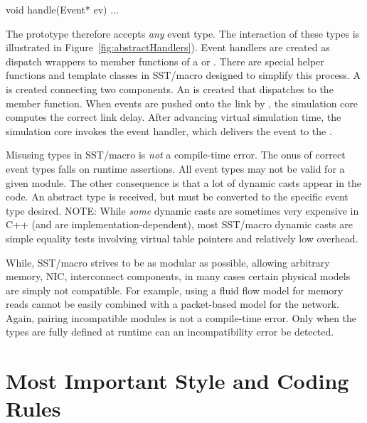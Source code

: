 \begin{CppCode}
void handle(Event* ev){
...
}
\end{CppCode}
The prototype therefore accepts \emph{any} event type. 
The interaction of these types is illustrated in Figure~\ref{fig:abstractHandlers}).
Event handlers are created as dispatch wrappers to member functions of a  or .
There are special helper functions and template classes in SST/macro designed to simplify this process.
A  is created connecting two components.
An  is created that dispatches to the  member function.
When events are pushed onto the link by ,
the simulation core computes the correct link delay.
After advancing virtual simulation time,
the simulation core invokes the event handler, which delivers the event to the .

Misusing types in SST/macro is \emph{not} a compile-time error.
The onus of correct event types falls on runtime assertions.
All event types may not be valid for a given module.
The other consequence is that a lot of dynamic casts appear in the code.
An abstract  type is received, but must be converted to the specific event type desired.
NOTE: While \emph{some} dynamic casts are sometimes very expensive in C++ (and are implementation-dependent),
most SST/macro dynamic casts are simple equality tests involving virtual table pointers and relatively low overhead.

While, SST/macro strives to be as modular as possible, allowing arbitrary memory, NIC, interconnect components,
in many cases certain physical models are simply not compatible.
For example, using a fluid flow model for memory reads cannot be easily combined with a packet-based model for the network.
Again, pairing incompatible modules is not a compile-time error.
Only when the types are fully defined at runtime can an incompatibility error be detected.

\section{Most Important Style and Coding Rules}
\label{sec:stylerules}


